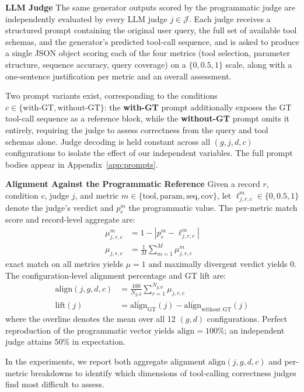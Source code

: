 \noindent\textbf{LLM Judge}
\label{sec:methodology:llmjudge}
The same generator outputs scored by the programmatic judge are independently evaluated by every LLM judge $j \in \mathcal{J}$. Each judge receives a structured prompt containing the original user query, the full set of available tool schemas, and the generator's predicted tool-call sequence, and is asked to produce a single JSON object scoring each of the four metrics (tool selection, parameter structure, sequence accuracy, query coverage) on a $\{0, 0.5, 1\}$ scale, along with a one-sentence justification per metric and an overall assessment.

Two prompt variants exist, corresponding to the conditions $c \in \{\text{with-GT}, \text{without-GT}\}$: the \textbf{with-GT} prompt additionally exposes the GT tool-call sequence as a reference block, while the \textbf{without-GT} prompt omits it entirely, requiring the judge to assess correctness from the query and tool schemas alone. Judge decoding is held constant across all $(g, j, d, c)$ configurations to isolate the effect of our independent variables. The full prompt bodies appear in Appendix~\ref{app:prompts}.

\noindent\textbf{Alignment Against the Programmatic Reference}
\label{sec:methodology:alignment}
Given a record $r$, condition $c$, judge $j$, and metric $m \in \{\text{tool}, \text{param}, \text{seq}, \text{cov}\}$, let $\ell^{m}_{j,r,c} \in \{0, 0.5, 1\}$ denote the judge's verdict and $p^{m}_r$ the programmatic value. The per-metric match score and record-level aggregate are:
\vspace{-0.2cm}
\begin{subequations}
\begin{align}
\mu^{m}_{j,r,c}
&=
1 - \left| p^{m}_r - \ell^{m}_{j,r,c} \right|
\label{eq:per-metric-match}
\\[4pt]
\mu_{j,r,c}
&=
\frac{1}{M}
\sum_{m=1}^{M}
\mu^{m}_{j,r,c}
\label{eq:overall_alignment}
\end{align}
\end{subequations}
\noindent exact match on all metrics yields $\mu = 1$ and maximally divergent verdict yields $0$. The configuration-level alignment percentage and GT lift are:
\vspace{-0.2cm}
\begin{subequations}
\begin{align}
\mathrm{align}(j, g, d, c)
&=
\frac{100}{N_{g,d}}
\sum_{r=1}^{N_{g,d}}
\mu_{j,r,c}
\label{eq:alignment}
\\[4pt]
\mathrm{lift}(j)
&=
\overline{\mathrm{align}}_{\text{GT}}(j)
-
\overline{\mathrm{align}}_{\text{without GT}}(j)
\label{eq:lift}
\end{align}
\end{subequations}
\noindent where the overline denotes the mean over all 12 $(g, d)$ configurations. Perfect reproduction of the programmatic vector yields $\mathrm{align} = 100\%$; an independent judge attains $50\%$ in expectation.

In the experiments, we report both aggregate alignment $\mathrm{align}(j, g, d, c)$ and per-metric breakdowns to identify which dimensions of tool-calling correctness judges find most difficult to assess.